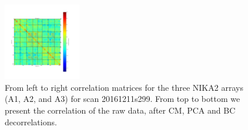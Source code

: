 \begin{figure}[ht]
\begin{center}
\includegraphics[width=0.3\textwidth]{Figures/DarkTests/corrmat_TOI_BC_array_3_20161211s299.pdf}
\end{center}
\caption{From left to right correlation matrices for the three NIKA2 arrays (A1, A2, and A3) for scan 20161211s299. From top to bottom we present the correlation of the raw data, after CM, PCA and BC decorrelations. \label{corrs299}}
\end{figure}



